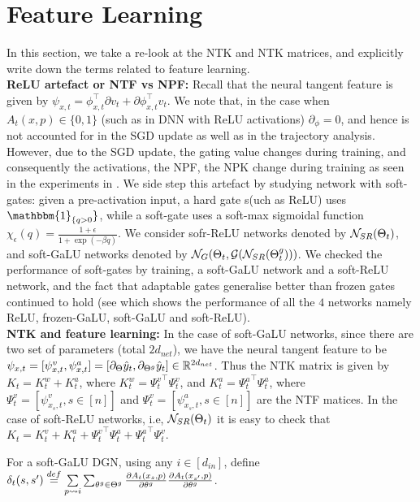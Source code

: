 \section{Feature Learning}
In this section, we take a re-look at the NTK and NTK matrices, and explicitly write down the terms related to feature learning.\hfill\\
\textbf{ReLU artefact or NTF vs NPF:} Recall that the neural tangent feature is given by $\psi_{x,t}=\phi^\top_{x,t} {\partial} v_t + {\partial} \phi^\top_{x,t} v_t$. We note that, in the case when $A_t(x,p)\in\{0,1\}$ (such as in DNN with ReLU activations)  $\partial_{\phi}=0$, and hence is not accounted for in the SGD update as well as in the trajectory analysis. However, due to the SGD update, the gating value changes during training, and consequently the activations, the NPF, the NPK change during training as seen in the experiments in . We side step this artefact by studying network with soft-gates: given a pre-activation input, a hard gate s(uch as ReLU) uses $\mathbbm{1}_{\{q>0}\}$, while a soft-gate uses a soft-max sigmoidal function $\chi_\epsilon(q)=\frac{1+\epsilon}{1+\exp(-\beta q)}$. We consider sofr-ReLU networks denoted by $\mathcal{N}_{SR}(\Theta_t)$, and soft-GaLU networks denoted by $\mathcal{N}_{G}(\Theta_t, \mathcal{G}(\mathcal{N}_{SR}({\Theta}^g_t)))$. We checked the performance of soft-gates by training, a soft-GaLU network and a soft-ReLU network, and the fact that adaptable gates generalise better than frozen gates continued to hold (see  which shows the performance of all the $4$ networks namely ReLU, frozen-GaLU, soft-GaLU and soft-ReLU).\hfill\\
\textbf{NTK and feature learning:} In the case of  soft-GaLU networks, since there are two set of parameters (total $2d_{net}$), we have the neural tangent feature to be $\psi_{x,t}=[\psi^v_{x,t},\psi^a_{x,t}]=[\partial_{\Theta} \hat{y}_t, \partial_{{\Theta}^g} \hat{y}_t]\in \mathbb{R}^{2d_{net}}$. Thus the NTK matrix is given by $K_t=K^w_t+K^a_t$,  where $K^w_t={\Psi^v_t}^\top \Psi^v_t$, and $K^a_t={\Psi^a_t}^\top \Psi^a_t$, where $\Psi^v_t=[\psi^v_{x_s,t},s\in[n]]$ and $\Psi^v_t=[\psi^a_{x_s,t},s\in[n]]$ are the NTF matices. In the case of  soft-ReLU networks, i.e, $\mathcal{N}_{SR}(\Theta_t)$  it is easy to check that $K_t={K^v_t}+{K^a_t}+{\Psi^v_t}^\top {\Psi^a_t}+{\Psi^a_t}^\top {\Psi^v_t}$.
\begin{definition}\label{def:delta}
For a soft-GaLU DGN, using any $i\in[d_{in}]$, define $\delta_t(s,s')\stackrel{def}= \underset{{p\rightsquigarrow i}}{\sum} \sum_{\theta^g\in{\Theta}^g}\frac{\partial A_{t}(x_s,p)}{\partial \theta^g} \frac{\partial A_{t}(x_{s'},p)}{\partial \theta^g}$.
\end{definition}


